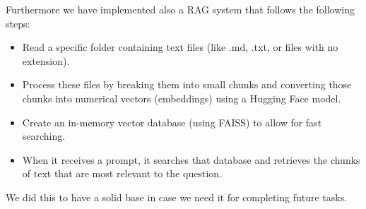 Furthermore we have implemented also a RAG system  that follows the following steps:
\begin{itemize}
    \item Read a specific folder containing text files (like .md, .txt, or files with no extension).
    \item Process these files by breaking them into small chunks and converting those chunks into numerical vectors (embeddings) using a Hugging Face model.
    \item Create an in-memory vector database (using FAISS) to allow for fast searching.
    \item When it receives a prompt, it searches that database and retrieves the chunks of text that are most relevant to the question.
\end{itemize}
We did this to have a solid base in case we need it for completing future tasks.